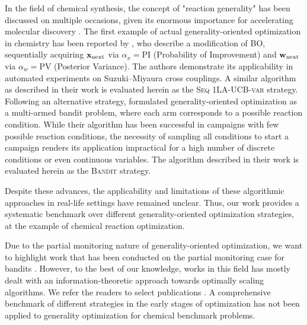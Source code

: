 In the field of chemical synthesis, the concept of "reaction generality" has been discussed on multiple occasions, given its enormous importance for accelerating molecular discovery \citep{wagen_screening_2022, prieto_kullmer_accelerating_2022, rein_generality-oriented_2023, betinol_data-driven_2023, rana_standardizing_2024, gallarati_genetic_2024, schmid_catalysing_2024}. The first example of actual generality-oriented optimization in chemistry has been reported by \citet{angello_closed-loop_2022}, who describe a modification of BO, sequentially acquiring ${\mathbf{x}}_{\text{next}}$ via $\alpha_x = \text{PI}$ (Probability of Improvement) and ${\mathbf{w}}_{\text{next}}$ via $\alpha_w = \text{PV}$ (Posterior Variance).
The authors demonstrate its applicability in automated experiments on Suzuki–Miyaura cross couplings. 
A similar algorithm as described in their work is evaluated herein as the \textsc{Seq 1LA-UCB-var} strategy.
Following an alternative strategy, \citet{wang_identifying_2024} formulated generality-oriented optimization as a multi-armed bandit problem, where each arm corresponds to a possible reaction condition.
While their algorithm has been successful in campaigns with few possible reaction conditions, the necessity of sampling all conditions to start a campaign renders its application impractical for a high number of discrete conditions or even continuous variables.
The algorithm described in their work is evaluated herein as the \textsc{Bandit} strategy.

Despite these advances, the applicability and limitations of these algorithmic approaches in real-life settings have remained unclear. 
Thus, our work provides a systematic benchmark over different generality-oriented optimization strategies, at the example of chemical reaction optimization.

Due to the partial monitoring nature of generality-oriented optimization, we want to highlight work that has been conducted on the partial monitoring case for bandits \citep{rustichini_minimizing_1999, lattimore_cleaning_2019, lattimore_bandit_2020}. 
However, to the best of our knowledge, works in this field has mostly dealt with an information-theoretic approach towards optimally scaling algorithms.
We refer the readers to select publications \citep{lattimore_information-theoretic_2019, kirschner_information_2020, lattimore_mirror_2021, lattimore_minimax_2022}.
A comprehensive benchmark of different strategies in the early stages of optimization has not been applied to generality optimization for chemical benchmark problems. 